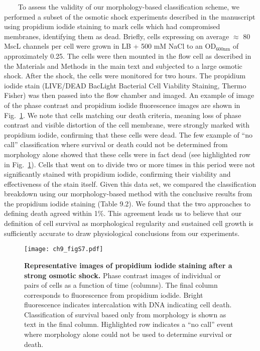 \documentclass[12pt]{caltech_thesis}
\begin{document}
~~~~To assess the validity of our morphology-based classification
scheme, we performed a subset of the osmotic shock experiments described
in the manuscript using propidium iodide staining to mark cells which
had compromised membranes, identifying them as dead. Briefly, cells
expressing on average \(\approx\) 80 MscL channels per cell were grown
in LB + 500 mM NaCl to an OD\(_{600\text{nm}}\) of approximately 0.25.
The cells were then mounted in the flow cell as described in the
Materials and Methods in the main text and subjected to a large osmotic
shock. After the shock, the cells were monitored for two hours. The
propidium iodide stain (LIVE/DEAD BacLight Bacterial Cell Viability
Staining, Thermo Fisher) was then passed into the flow chamber and
imaged. An example of image of the phase contrast and propidium iodide
fluorescence images are shown in Fig.~\ref{fig:pi_death}. We note that
cells matching our death criteria, meaning loss of phase contrast and
visible distortion of the cell membrane, were strongly marked with
propidium iodide, confirming that these cells were dead. The few example
of ``no call'' classification where survival or death could not be
determined from morphology alone showed that these cells were in fact
dead (see highlighted row in Fig.~\ref{fig:pi_death}). Cells that went
on to divide two or more times in this period were not significantly
stained with propidium iodide, confirming their viability and
effectiveness of the stain itself. Given this data set, we compared the
classification breakdown using our morphology-based method with the
conclusive results from the propidium iodide staining (Table 9.2). We
found that the two approaches to defining death agreed within 1\%. This
agreement leads us to believe that our definition of cell survival as
morphological regularity and sustained cell growth is sufficiently
accurate to draw physiological conclusions from our experiments.

\hypertarget{fig:pi_death}{%
\begin{figure}
\centering
\texttt{[image: ch9\_figS7.pdf]}
\caption[{Representative images of propidium iodide staining after a
strong osmotic shock.}]{\textbf{Representative images of propidium
iodide staining after a strong osmotic shock.} Phase contrast images of
individual or pairs of cells as a function of time (columns). The final
column corresponds to fluorescence from propidium iodide. Bright
fluorescence indicates intercalation with DNA indicating cell death.
Classification of survival based only from morphology is shown as text
in the final column. Highlighted row indicates a ``no call'' event where
morphology alone could not be used to determine survival or death.}
\label{fig:pi_death}
\end{figure}
}
\end{document}
